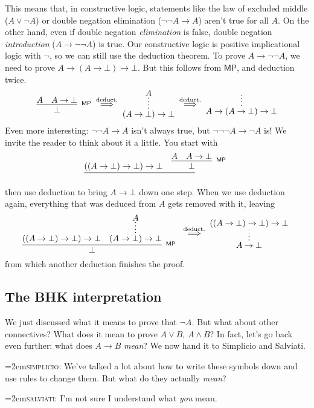 \documentclass[11pt,paper=letter]{scrartcl}
\renewcommand{\sf}{\mathsf}
\renewcommand{\land}{\wedge}
\renewcommand{\lor}{\vee}
\renewcommand{\lnot}{\neg}
\newcommand{\false}{\bot}
\newcommand{\vc}[1]{\vcenter{\hbox{#1}}}
\newcommand{\simp}{\vspace{0.5em}\noindent\hangindent=2em\textsc{simplicio:} }
\newcommand{\salv}{\vspace{0.5em}\noindent\hangindent=2em\textsc{salviati:} }
\begin{document}
This means that, in constructive logic, statements like the law of excluded middle ($A \lor \lnot A$) or double negation elimination ($\lnot \lnot A \to A$) aren't true for all $A$. On the other hand, even if double negation \emph{elimination} is false, double negation \emph{introduction} ($A \to \lnot\lnot A$) is true. Our constructive logic is positive implicational logic with $\lnot$, so we can still use the deduction theorem. To prove $A \to \lnot\lnot A$, we need to prove $A \to (A \to \false) \to \false$. But this follows from $\sf{MP}$, and deduction twice.
\begin{align*}
\vc{\infer[^\sf{MP}]
{\false}
{A & A \to \false}}
\;\overset{\text{deduct.}}{\implies}\;
\vc{\infer*
{(A \to \false) \to \false}
{A}}
\;\overset{\text{deduct.}}{\implies}\;
\vc{\infer*
{A \to (A \to \false) \to \false}
{}}
\end{align*}
Even more interesting: $\lnot\lnot A \to A$ isn't always true, but $\lnot\lnot\lnot A \to \lnot A$ is! We invite the reader to think about it a little. You start with
\begin{align*}
\vc{\infer
{\phantom{\false}}
{
((A \to \false) \to \false) \to \false
&
\infer[^\sf{MP}]
{\false}
{A & A \to \false}
}
}
\end{align*}
then use deduction to bring $A \to \false$ down one step. When we use deduction again, everything that was deduced from $A$ gets removed with it, leaving
\begin{align*}
\vc{\infer[^\sf{MP}]
{\false}
{
((A \to \false) \to \false) \to \false
&
\infer*
{(A \to \false) \to \false}
{A}
}
}
\;\overset{\text{deduct.}}{\implies}\;
\vc{\infer*
{A \to \false}
{
((A \to \false) \to \false) \to \false
}
}
\end{align*}
from which another deduction finishes the proof.

\subsection{The BHK interpretation}

We just discussed what it means to prove that $\lnot A$. But what about other connectives? What does it mean to prove $A \lor B$, $A \land B$? In fact, let's go back even further: what does $A \to B$ \emph{mean}? We now hand it to Simplicio and Salviati.

\simp We've talked a lot about how to write these symbols down and use rules to change them. But what do they actually \emph{mean}?

\salv I'm not sure I understand what \emph{you} mean.
\end{document}
